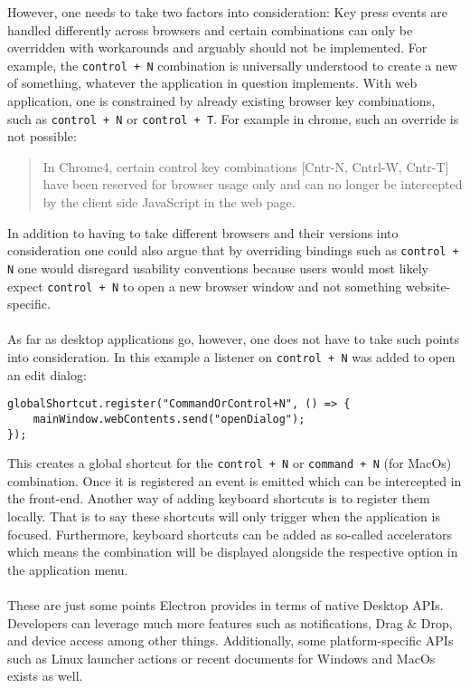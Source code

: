 However, one needs to take two factors into consideration:
Key press events are handled differently across browsers and certain combinations can only be 
overridden with workarounds and arguably should not be implemented. \parencite{mdnKeyboardEvent}
For example, the \lstinline[columns=fixed]{control + N} combination is universally understood to create 
a new of something, whatever the application in question implements.
With web application, one is constrained by already existing browser key combinations, such as \lstinline[columns=fixed]{control + N} or 
\lstinline[columns=fixed]{control + T}.
For example in chrome, such an override is not possible:
\blockquote{In Chrome4, certain control key combinations [Cntr-N, Cntrl-W, Cntr-T] have been reserved for browser 
usage only and can no longer be intercepted by the client side JavaScript 
in the web page.}
\parencite{chromeIssueTrackerV4}
In addition to having to take different browsers and their versions into consideration one could also argue
that by overriding bindings such as \lstinline[columns=fixed]{control + N} one would disregard usability
conventions because users would most likely expect \lstinline[columns=fixed]{control + N} to open a new 
browser window and not something website-specific. \parencite{usabilityHeuristics}\paragraph*{}
As far as desktop applications go, however, one does not have to take such points into consideration.
In this example a listener on \lstinline[columns=fixed]{control + N} was added to open an edit dialog:
\begin{lstlisting}[caption=Adding a global keyboard shortcut.]
globalShortcut.register("CommandOrControl+N", () => {
    mainWindow.webContents.send("openDialog");
});
\end{lstlisting}
This creates a global shortcut for the \lstinline[columns=fixed]{control + N} or \lstinline[columns=fixed]{command + N} 
(for MacOs) combination. 
Once it is registered an event is emitted which can be intercepted in the front-end. 
Another way of adding keyboard shortcuts is to register them locally. 
That is to say these shortcuts will only trigger when the application is focused. \parencite{electronKeyboardShortcuts}
Furthermore, keyboard shortcuts can be added as so-called accelerators which means the combination will
be displayed alongside the respective option in the application menu. \paragraph{}
These are just some points Electron provides in terms of native Desktop APIs. 
Developers can leverage much more features such as notifications, Drag \& Drop, and device access among other things.
Additionally, some platform-specific APIs such as Linux launcher actions or recent documents for Windows and MacOs
exists as well.